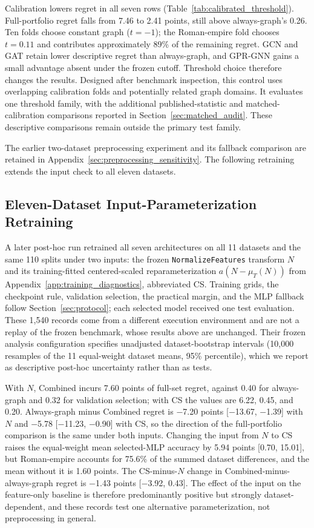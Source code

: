 Calibration lowers regret in all seven rows (Table~\ref{tab:calibrated_threshold}). Full-portfolio regret falls from 7.46 to 2.41 points, still above always-graph's 0.26. Ten folds choose constant graph ($t=-1$); the Roman-empire fold chooses $t=0.11$ and contributes approximately 89\% of the remaining regret. GCN and GAT retain lower descriptive regret than always-graph, and GPR-GNN gains a small advantage absent under the frozen cutoff. Threshold choice therefore changes the results. Designed after benchmark inspection, this control uses overlapping calibration folds and potentially related graph domains. It evaluates one threshold family, with the additional published-statistic and matched-calibration comparisons reported in Section~\ref{sec:matched_audit}. These descriptive comparisons remain outside the primary test family.

The earlier two-dataset preprocessing experiment and its fallback comparison are retained in Appendix~\ref{sec:preprocessing_sensitivity}. The following retraining extends the input check to all eleven datasets.

\subsection{Eleven-Dataset Input-Parameterization Retraining}
\label{sec:input_robustness}

A later post-hoc run retrained all seven architectures on all 11 datasets and the same 110 splits under two inputs: the frozen \texttt{NormalizeFeatures} transform $N$ and its training-fitted centered-scaled reparameterization $a(N-\mu_T(N))$ from Appendix~\ref{app:training_diagnostics}, abbreviated CS. Training grids, the checkpoint rule, validation selection, the practical margin, and the MLP fallback follow Section~\ref{sec:protocol}; each selected model received one test evaluation. These 1,540 records come from a different execution environment and are not a replay of the frozen benchmark, whose results above are unchanged. Their frozen analysis configuration specifies unadjusted dataset-bootstrap intervals (10,000 resamples of the 11 equal-weight dataset means, 95\% percentile), which we report as descriptive post-hoc uncertainty rather than as tests.

With $N$, Combined incurs 7.60 points of full-set regret, against 0.40 for always-graph and 0.32 for validation selection; with CS the values are 6.22, 0.45, and 0.20. Always-graph minus Combined regret is $-$7.20 points [$-$13.67, $-$1.39] with $N$ and $-$5.78 [$-$11.23, $-$0.90] with CS, so the direction of the full-portfolio comparison is the same under both inputs. Changing the input from $N$ to CS raises the equal-weight mean selected-MLP accuracy by 5.94 points [0.70, 15.01], but Roman-empire accounts for 75.6\% of the summed dataset differences, and the mean without it is 1.60 points. The CS-minus-$N$ change in Combined-minus-always-graph regret is $-$1.43 points [$-$3.92, 0.43]. The effect of the input on the feature-only baseline is therefore predominantly positive but strongly dataset-dependent, and these records test one alternative parameterization, not preprocessing in general.

